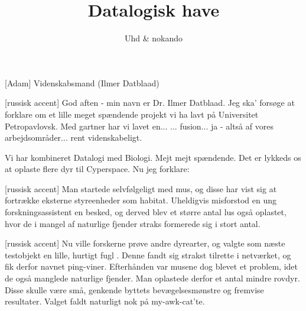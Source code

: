\documentclass[a4paper,11pt]{article}
\title{Datalogisk have}
\author{Uhd \& nokando}
\begin{document}
\maketitle

\begin{roles}
[Adam] Videnskabsmand (Ilmer Datblaad)
\end{roles}

\begin{props}
\end{props}


\begin{sketch}
  
  
 [russisk accent] God aften - min navn er Dr. Ilmer Datblaad. Jeg ska'
forsøge at forklare om et lille meget spændende projekt vi ha lavt på Universitet
Petropavlovsk. Med gartner har vi lavet en...  ... fusion...
ja - altså af vores arbejdsområder... rent videnskabeligt.

Vi har kombineret Datalogi med Biologi. Mejt mejt spændende. Det er lykkeds os at
oplaste flere dyr til Cyperspace. Nu jeg forklare:


 [russisk accent] Man startede selvfølgeligt med  mus, og disse
  har vist sig at fortrække eksterne styreenheder som
  habitat. Uheldigvis misforstod en ung forskningsassistent en besked,
  og derved blev et større antal lus  også oplastet, hvor de i mangel af naturlige fjender straks
  formerede sig i stort antal.
  
   [russisk accent] Nu ville forskerne prøve andre dyrearter, og valgte
  som næste testobjekt en lille, hurtigt fugl . Denne fandt sig strakst tilrette i netværket, og fik derfor
  navnet ping-viner. Efterhånden var musene dog blevet et problem, idet de også
  manglede naturlige fjender. Man oplastede derfor et antal mindre rovdyr. Disse
  skulle være små, genkende byttets bevægelsesmønstre og fremvise resultater.
  Valget faldt naturligt nok på  my-awk-cat'te.
  

\end{sketch}
\end{document}
